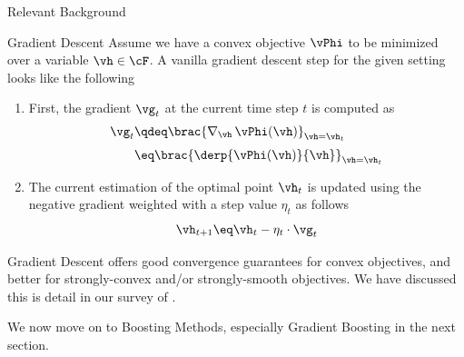 \documentclass{article}
\begin{document}
\begin{psection}{Relevant Background}
\begin{psubsection}{Gradient Descent}
		Assume we have a convex objective $\vPhi$ to be minimized over a variable $\vh \in \cF$. A vanilla gradient descent step for the given setting looks like the following
		\begin{enumerate}
			\item First, the gradient $\vg_t$ at the current time step $t$ is computed as
				\begin{align*}
					\vg_t &\qdeq	\brac{\nabla_\vh\,\vPhi(\vh)}_{\vh = \vh_t} \\[.2em]
					&\eq			\brac{\derp{\vPhi(\vh)}{\vh}}_{\vh = \vh_t}
				\end{align*}
			\item The current estimation of the optimal point $\vh_t$ is updated using the negative gradient weighted with a step value $\eta_t$ as follows
				\begin{align*}
					\vh_{t + 1} \eq \vh_t - \eta_t \cdot \vg_t
				\end{align*}
		\end{enumerate}

		Gradient Descent offers good convergence guarantees for convex objectives, and better for strongly-convex and/or strongly-smooth objectives. We have discussed this is detail in our survey of .

	\end{psubsection}

	We now move on to Boosting Methods, especially Gradient Boosting in the next section.

\end{psection}
\end{document}
